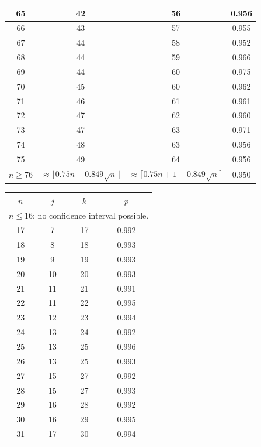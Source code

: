 \begin{table}
\begin{tabular}{|c|c|c|c|}
 65  & 42  & 56 & 0.956  \\ \hline
 66  & 43  & 57 & 0.955  \\ \hline
 67  & 44  & 58 & 0.952  \\ \hline
 68  & 44  & 59 & 0.966  \\ \hline
 69  & 44  & 60 & 0.975  \\ \hline
 70  & 45  & 60 & 0.962  \\ \hline
 71  & 46  & 61 & 0.961  \\ \hline
 72  & 47  & 62 & 0.960  \\ \hline
 73  & 47  & 63 & 0.971  \\ \hline
 74  & 48  & 63 & 0.956  \\ \hline
 75  & 49  & 64 & 0.956  \\ \hline
\hline $n \geq 76$ &
\multicolumn{1}{p{20mm}|}{$\approx \lfloor 0.75 n - 0.849 \sqrt{n}\rfloor$} &
\multicolumn{1}{p{20mm}|}{$\approx \lceil 0.75 n + 1 + 0.849 \sqrt{n}\rceil$} &
0.950 \\ \hline
\end{tabular}
 \hspace{2mm}
\hspace{2mm}
 \begin{tabular}{|c|c|c|c|}
 \hline $n$ & $j$ & $k$ & $p$ \\ \hline \hline
\multicolumn{4}{|c|}{
$n \leq 16 $: no confidence interval possible.}\\ \hline
 17  & 7  & 17 & 0.992  \\ \hline
 18  & 8  & 18 & 0.993  \\ \hline
 19  & 9  & 19 & 0.993  \\ \hline
 20  & 10  & 20 & 0.993  \\ \hline
 21  & 11  & 21 & 0.991  \\ \hline
 22  & 11  & 22 & 0.995  \\ \hline
 23  & 12  & 23 & 0.994  \\ \hline
 24  & 13  & 24 & 0.992  \\ \hline
 25  & 13  & 25 & 0.996  \\ \hline
 26  & 13  & 25 & 0.993  \\ \hline
 27  & 15  & 27 & 0.992  \\ \hline
 28  & 15  & 27 & 0.993  \\ \hline
 29  & 16  & 28 & 0.992  \\ \hline
 30  & 16  & 29 & 0.995  \\ \hline
 31  & 17  & 30 & 0.994  \\ \hline

\end{tabular}
\end{table}
